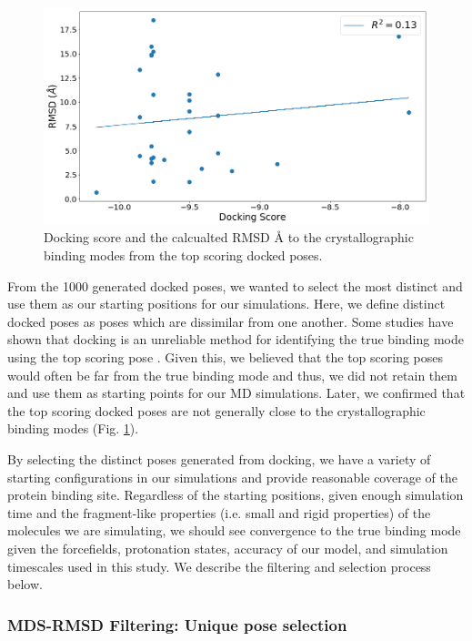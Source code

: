 \begin{figure}
    \centering
    \includegraphics[width=\linewidth]{chapter6/Figures/topscore.png}
    \caption[Docking score vs RMSD]{Docking score and the calcualted RMSD {\AA} to the crystallographic binding modes from the top scoring docked poses.}
    \label{fig:topscore}
\end{figure}

From the 1000 generated docked poses, we wanted to select the most distinct and use them as our starting positions for our simulations.
Here, we define distinct docked poses as poses which are dissimilar from one another.
Some studies have shown that docking is an unreliable method for identifying the true binding mode using the top scoring pose \cite{warren_critical_2006}.
Given this, we believed that the top scoring poses would often be far from the true binding mode and thus, we did not retain them and use them as starting points for our MD simulations.
Later, we confirmed that the top scoring docked poses are not generally close to the crystallographic binding modes (Fig. \ref{fig:topscore}).

By selecting the distinct poses generated from docking, we have a variety of starting configurations in our simulations and provide reasonable coverage of the protein binding site.
Regardless of the starting positions, given enough simulation time and the fragment-like properties (i.e. small and rigid properties) of the molecules we are simulating, we should see convergence to the true binding mode given the forcefields, protonation states, accuracy of our model, and simulation timescales used in this study.
We describe the filtering and selection process below.

\subsubsection{MDS-RMSD Filtering: Unique pose selection}

